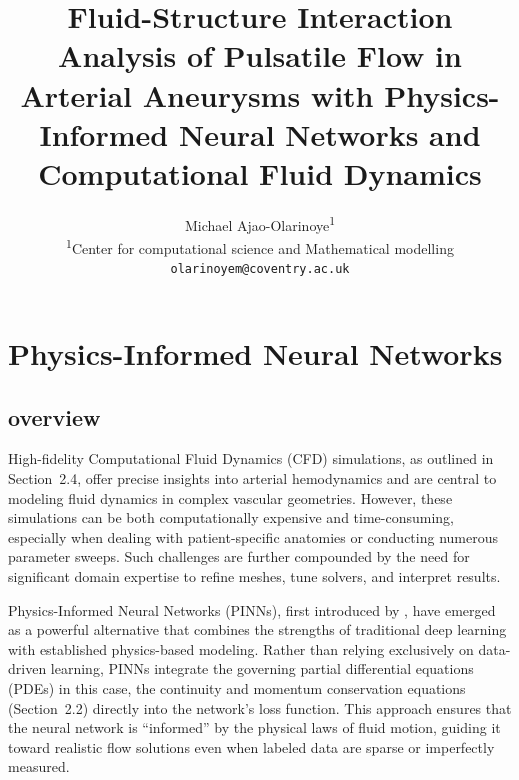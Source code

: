 \documentclass[12pt, a4paper]{article}
\title{
    \vspace{-2cm} %
    \large \textbf{Fluid-Structure Interaction Analysis of Pulsatile Flow in Arterial Aneurysms with Physics-Informed Neural Networks and Computational Fluid Dynamics}\\
}
\author{
    Michael Ajao-Olarinoye\textsuperscript{1} \\
    \textsuperscript{1}Center for computational science and Mathematical modelling \\
    \texttt{olarinoyem@coventry.ac.uk}
}
\date{}
\begin{document}
\maketitle




\section{Physics-Informed Neural Networks}
\label{sec:PINNs}

\subsection{overview}
\label{sec:PINN_Overview}

High-fidelity Computational Fluid Dynamics (CFD) simulations, as outlined in Section~2.4, offer precise insights into arterial hemodynamics and are central to modeling fluid dynamics in complex vascular geometries. However, these simulations can be both computationally expensive and time-consuming, especially when dealing with patient-specific anatomies or conducting numerous parameter sweeps. Such challenges are further compounded by the need for significant domain expertise to refine meshes, tune solvers, and interpret results.

Physics-Informed Neural Networks (PINNs), first introduced by \citet{raissi2019physics}, have emerged as a powerful alternative that combines the strengths of traditional deep learning with established physics-based modeling. Rather than relying exclusively on data-driven learning, PINNs integrate the governing partial differential equations (PDEs) in this case, the continuity and momentum conservation equations (Section~2.2) directly into the network's loss function. This approach ensures that the neural network is ``informed'' by the physical laws of fluid motion, guiding it toward realistic flow solutions even when labeled data are sparse or imperfectly measured.
\end{document}
